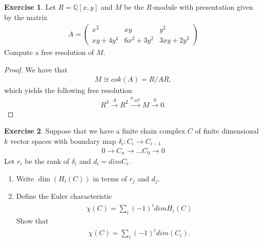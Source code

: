 \documentclass[12pt]{extarticle}
\newcommand{\Q}{\mathbb{Q}}
\newcommand{\<}{\langle}
\renewcommand{\>}{\rangle}
\theoremstyle{definition}
\newtheorem{exercise}{Exercise}
\begin{document}
\begin{exercise}
  Let $R= \Q[x,y]$ and $M$ be the $R$-module with presentation given by the matrix
  \begin{align*}
    A =
    \begin{pmatrix}
      x^2     & xy          & y^2 \\
      xy+4y^4 & 6x^2 + 3y^2 & 3xy + 2y^2  
    \end{pmatrix}
  \end{align*}
  Compute a free resolution of $M$.
\end{exercise}
\begin{proof}
  We have that
  \begin{align*}
    M \cong cok(A) = R/AR,
  \end{align*}
  which yields the following free resolution 
  \begin{align*}
    R^3 \xrightarrow{A} R^2 \xrightarrow{\pi_{AR^2}} M \xrightarrow{0} 0.
  \end{align*}
\end{proof}
\begin{exercise}
  Suppose that we have a finite chain complex $C$ of finite dimensional $k$ vector spaces with boundary map $\delta_i: C_i \to C_{i-1}$
  \begin{align*}
    0 \to C_n \to \dots C_0 \to 0
  \end{align*}
  Let $r_i$ be the rank of $\delta_i$ and $d_i = dim C_i $.
    \begin{enumerate}
    \item
      Write $\dim(H_i(C))$ in terms of $r_j$ and $d_j$.
    \item
      Define the Euler characteristic
      \begin{align*}
        \chi(C) = \sum\limits_{i} (-1)^i dim H_i(C)
      \end{align*}
      Show that
      \begin{align*}
        \chi(C) = \sum\limits_{i} (-1)^i dim (C_i).
      \end{align*}
    \end{enumerate}
\end{exercise}
\end{document}
